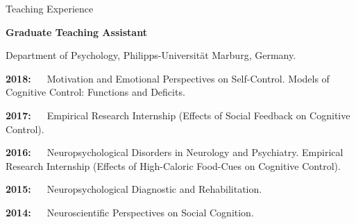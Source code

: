 \begin{rubric}{Teaching Experience}


\textbf{Graduate Teaching Assistant} \par Department of Psychology, Philipps-Universit\"at Marburg, Germany. \par

\vspace{5pt}
\mbox{\textbf{2018: ~ }}Motivation and Emotional Perspectives on Self-Control. 
\newline Models of Cognitive Control: Functions and Deficits.

\vspace{5pt}
\mbox{\textbf{2017: ~ }}Empirical Research Internship (Effects of Social Feedback on Cognitive Control).

\vspace{5pt}
\mbox{\textbf{2016: ~ }}Neuropsychological Disorders in Neurology and Psychiatry. 
\newline Empirical Research Internship (Effects of High-Caloric Food-Cues on Cognitive Control).

\vspace{5pt}
\mbox{\textbf{2015: ~ }}Neuropsychological Diagnostic and Rehabilitation.

\vspace{5pt}
\mbox{\textbf{2014: ~ }}Neuroscientific Perspectives on Social Cognition.

\end{rubric}
